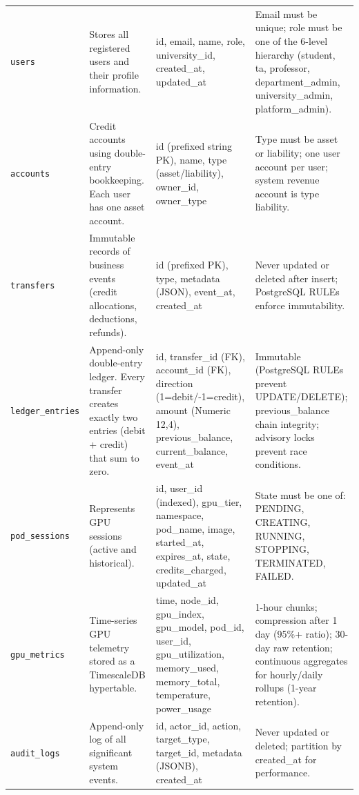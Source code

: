 \documentclass[12pt,a4paper]{article}
\begin{document}
\begin{longtable}{@{}L{2.8cm}L{3.5cm}L{4cm}L{5cm}@{}}
  \texttt{users} & Stores all registered users and their profile information. & id, email, name, role, university\_id, created\_at, updated\_at & Email must be unique; role must be one of the 6-level hierarchy (student, ta, professor, department\_admin, university\_admin, platform\_admin). \\
    \texttt{accounts} & Credit accounts using double-entry bookkeeping. Each user has one asset account. & id (prefixed string PK), name, type (asset/liability), owner\_id, owner\_type & Type must be asset or liability; one user account per user; system revenue account is type liability. \\
  \texttt{transfers} & Immutable records of business events (credit allocations, deductions, refunds). & id (prefixed PK), type, metadata (JSON), event\_at, created\_at & Never updated or deleted after insert; PostgreSQL RULEs enforce immutability. \\
    \texttt{ledger\_entries} & Append-only double-entry ledger. Every transfer creates exactly two entries (debit + credit) that sum to zero. & id, transfer\_id (FK), account\_id (FK), direction (1=debit/-1=credit), amount (Numeric 12,4), previous\_balance, current\_balance, event\_at & Immutable (PostgreSQL RULEs prevent UPDATE/DELETE); previous\_balance chain integrity; advisory locks prevent race conditions. \\
  \texttt{pod\_sessions} & Represents GPU sessions (active and historical). & id, user\_id (indexed), gpu\_tier, namespace, pod\_name, image, started\_at, expires\_at, state, credits\_charged, updated\_at & State must be one of: PENDING, CREATING, RUNNING, STOPPING, TERMINATED, FAILED. \\
    \texttt{gpu\_metrics} & Time-series GPU telemetry stored as a TimescaleDB hypertable. & time, node\_id, gpu\_index, gpu\_model, pod\_id, user\_id, gpu\_utilization, memory\_used, memory\_total, temperature, power\_usage & 1-hour chunks; compression after 1 day (95\%+ ratio); 30-day raw retention; continuous aggregates for hourly/daily rollups (1-year retention). \\
  \texttt{audit\_logs} & Append-only log of all significant system events. & id, actor\_id, action, target\_type, target\_id, metadata (JSONB), created\_at & Never updated or deleted; partition by created\_at for performance. \\

\end{longtable}
\end{document}
